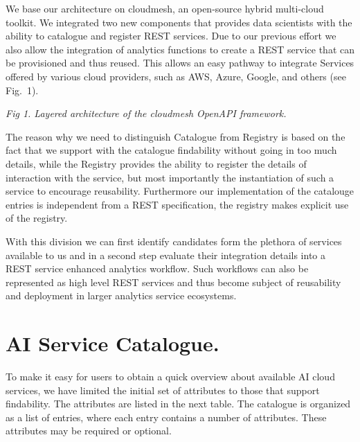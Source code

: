\documentclass[A0,6pt]{article}
\begin{document}
\begin{multicols}{3}
We base our architecture on cloudmesh, an open-source hybrid multi-cloud toolkit. We integrated two new components that provides data scientists with the ability to catalogue and register REST services. Due to our previous effort we also allow the integration of analytics functions to create a REST service that can be provisioned and thus reused. This allows an easy pathway to integrate Services offered by various cloud providers, such as AWS, Azure, Google, and others (see Fig.~1).  

\begin{center}
\end{center}
\vspace{-12pt}
{\em Fig 1. Layered architecture of the cloudmesh Open\-API framework.}

The reason why we need to distinguish Catalogue from Registry is based on the fact that we support with the catalogue findability without going in too much details, while the Registry provides the ability to register the details of interaction with the service, but most importantly the instantiation of such a service to encourage reusability. Furthermore our implementation of the catalouge entries is independent from a REST specification, the registry makes explicit use of the registry. 

With this division we can first identify candidates form the plethora of services available to us and in a second step evaluate their integration details into a REST service enhanced analytics workflow. Such workflows can also be represented as high level REST services and thus become subject of reusability and deployment in larger analytics service ecosystems. 


\section*{AI Service Catalogue.}
To make it easy for users to obtain a quick overview about available AI cloud services, we have limited the initial set of attributes to those that support findability. The attributes are listed in the next table. The catalogue is organized as a list of entries, where each entry contains a number of attributes. These attributes may be required or optional. 


\end{multicols}
\end{document}
